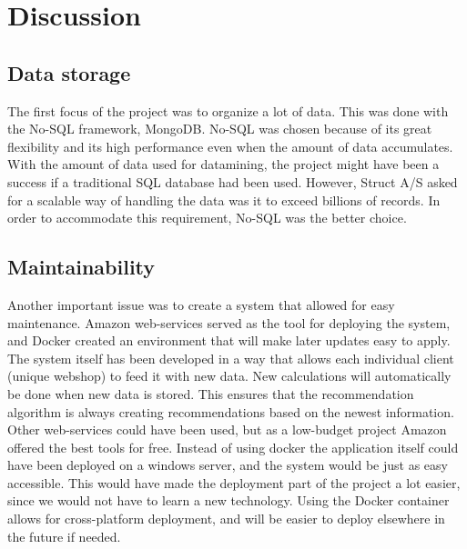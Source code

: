 
\chapter{Discussion} %

\label{Chapter7} %

\section{Data storage}
The first focus of the project was to organize a lot of data. This was done with the No-SQL framework, MongoDB. No-SQL was chosen because of its great flexibility and its high performance even when the amount of data accumulates. With the amount of data used for datamining, the project might have been a success if a traditional SQL database had been used. However, Struct A/S asked for a scalable way of handling the data was it to exceed billions of records. In order to accommodate this requirement, No-SQL was the better choice.

\section{Maintainability}
Another important issue was to create a system that allowed for easy maintenance. Amazon web-services served as the tool for deploying the system, and Docker created an environment that will make later updates easy to apply. The system itself has been developed in a way that allows each individual client (unique webshop) to feed it with new data. New calculations will automatically be done when new data is stored. This ensures that the recommendation algorithm is always creating recommendations based on the newest information. Other web-services could have been used, but as a low-budget project Amazon offered the best tools for free.
Instead of using docker the application itself could have been deployed on a windows server, and the system would be just as easy accessible. This would have made the deployment part of the project a lot easier, since we would not have to learn a new technology. Using the Docker container allows for cross-platform deployment, and will be easier to deploy elsewhere in the future if needed.

